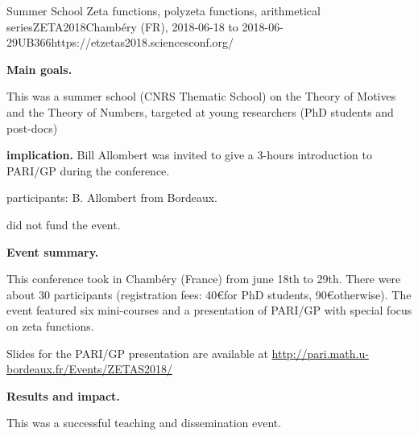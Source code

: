 \begin{event}{Summer School Zeta functions, polyzeta functions, arithmetical
  series}{ZETA2018}{Chamb\'ery (FR),
  2018-06-18 to 2018-06-29}{UB}{36}{6}{https://etzetas2018.sciencesconf.org/}

\textbf{Main goals.}

  This was a summer school (CNRS Thematic School) on the Theory of Motives and
  the Theory of Numbers, targeted at young researchers (PhD students and
  post-docs)

\textbf{\ODK implication.}
Bill Allombert was invited to give a 3-hours introduction to PARI/GP during
the conference.

\ODK participants: B. Allombert from Bordeaux.

\ODK did not fund the event.

\textbf{Event summary.}

  This conference took in Chamb\'ery (France) from june 18th to
29th. There were about 30 participants (registration fees: 40\euro for PhD
  students, 90\euro otherwise). The event
  featured six mini-courses and a presentation of PARI/GP with special focus
  on zeta functions.

Slides for the PARI/GP presentation are available at
\url{http://pari.math.u-bordeaux.fr/Events/ZETAS2018/}

\textbf{Results and impact.}

This was a successful teaching and dissemination event.
\end{event}
